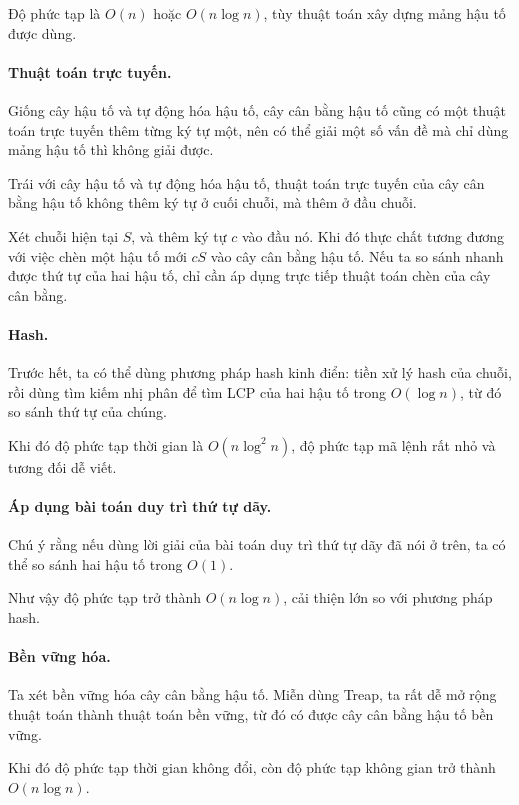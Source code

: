 \documentclass[11pt]{article}
\begin{document}
Độ phức tạp là \(O(n)\) hoặc \(O(n\log n)\), tùy thuật toán xây dựng mảng
hậu tố được dùng.

\paragraph{Thuật toán trực tuyến.}
Giống cây hậu tố và tự động hóa hậu tố, cây cân bằng hậu tố cũng có một
thuật toán trực tuyến thêm từng ký tự một, nên có thể giải một số vấn đề mà
chỉ dùng mảng hậu tố thì không giải được.

Trái với cây hậu tố và tự động hóa hậu tố, thuật toán trực tuyến của cây cân
bằng hậu tố không thêm ký tự ở cuối chuỗi, mà thêm ở đầu chuỗi.

Xét chuỗi hiện tại \(S\), và thêm ký tự \(c\) vào đầu nó. Khi đó thực chất
tương đương với việc chèn một hậu tố mới \(cS\) vào cây cân bằng hậu tố. Nếu
ta so sánh nhanh được thứ tự của hai hậu tố, chỉ cần áp dụng trực tiếp thuật
toán chèn của cây cân bằng.

\paragraph{Hash.}
Trước hết, ta có thể dùng phương pháp hash kinh điển: tiền xử lý hash của
chuỗi, rồi dùng tìm kiếm nhị phân để tìm LCP của hai hậu tố trong
\(O(\log n)\), từ đó so sánh thứ tự của chúng.

Khi đó độ phức tạp thời gian là \(O(n\log^2 n)\), độ phức tạp mã lệnh rất
nhỏ và tương đối dễ viết.

\paragraph{Áp dụng bài toán duy trì thứ tự dãy.}
Chú ý rằng nếu dùng lời giải của bài toán duy trì thứ tự dãy đã nói ở trên,
ta có thể so sánh hai hậu tố trong \(O(1)\).

Như vậy độ phức tạp trở thành \(O(n\log n)\), cải thiện lớn so với phương
pháp hash.

\paragraph{Bền vững hóa.}
Ta xét bền vững hóa cây cân bằng hậu tố. Miễn dùng Treap, ta rất dễ mở rộng
thuật toán thành thuật toán bền vững, từ đó có được cây cân bằng hậu tố bền
vững.

Khi đó độ phức tạp thời gian không đổi, còn độ phức tạp không gian trở thành
\(O(n\log n)\).
\end{document}
